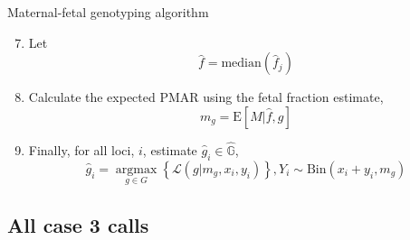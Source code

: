 \documentclass[
  10pt,
  ignorenonframetext,
  m]{beamer}
\begin{document}
\begin{frame}{Maternal-fetal genotyping algorithm}
\protect\hypertarget{maternal-fetal-genotyping-algorithm-3}{}

\begin{enumerate}
\setcounter{enumi}{6}
\item
  Let \[
  \hat{f} = \text{median}\left(\hat{f}_j\right)
    \]
\item
  Calculate the expected PMAR using the fetal fraction estimate, \[
   m_g = \text{E}[M|\hat{f},g]
    \]
\item
  Finally, for all loci, \(i\), estimate
  \(\hat{g}_i \in \hat{\mathbb{G}}\), \[
    \hat{g}_i = \mathop{\text{argmax}}\limits_{g \in G}\left\{\mathcal{L}(g \rvert m_g,x_i,y_i)\right\}, Y_{i} \sim \text{Bin}(x_i + y_i, m_g)
    \]
\end{enumerate}

\end{frame}

\hypertarget{all-case-3-calls}{%
\subsection{All case 3 calls}\label{all-case-3-calls}}
\end{document}
